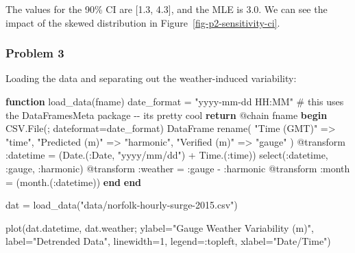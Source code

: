 \documentclass[
  letterpaper,
  DIV=11,
  numbers=noendperiod]{scrartcl}
\newenvironment{Shaded}{\begin{snugshade}}{\end{snugshade}}
\newcommand{\CommentTok}[1]{\textcolor[rgb]{0.37,0.37,0.37}{#1}}
\newcommand{\ControlFlowTok}[1]{\textcolor[rgb]{0.00,0.23,0.31}{\textbf{#1}}}
\newcommand{\DataTypeTok}[1]{\textcolor[rgb]{0.68,0.00,0.00}{#1}}
\newcommand{\FloatTok}[1]{\textcolor[rgb]{0.68,0.00,0.00}{#1}}
\newcommand{\FunctionTok}[1]{\textcolor[rgb]{0.28,0.35,0.67}{#1}}
\newcommand{\KeywordTok}[1]{\textcolor[rgb]{0.00,0.23,0.31}{\textbf{#1}}}
\newcommand{\NormalTok}[1]{\textcolor[rgb]{0.00,0.23,0.31}{#1}}
\newcommand{\OperatorTok}[1]{\textcolor[rgb]{0.37,0.37,0.37}{#1}}
\newcommand{\PreprocessorTok}[1]{\textcolor[rgb]{0.68,0.00,0.00}{#1}}
\newcommand{\StringTok}[1]{\textcolor[rgb]{0.13,0.47,0.30}{#1}}
\begin{document}
The values for the 90\% CI are {[}1.3, 4.3{]}, and the MLE is 3.0. We
can see the impact of the skewed distribution in
Figure~\ref{fig-p2-sensitivity-ci}.

\subsubsection{Problem 3}\label{problem-3}

Loading the data and separating out the weather-induced variability:

\begin{Shaded}
\begin{Highlighting}[]
\KeywordTok{function} \FunctionTok{load\_data}\NormalTok{(fname)}
\NormalTok{    date\_format }\OperatorTok{=} \StringTok{"yyyy{-}mm{-}dd HH:MM"}
    \CommentTok{\# this uses the DataFramesMeta package {-}{-} it\textquotesingle{}s pretty cool}
    \ControlFlowTok{return} \PreprocessorTok{@chain}\NormalTok{ fname }\ControlFlowTok{begin}
\NormalTok{        CSV.}\FunctionTok{File}\NormalTok{(; dateformat}\OperatorTok{=}\NormalTok{date\_format)}
\NormalTok{        DataFrame}
        \FunctionTok{rename}\NormalTok{(}
            \StringTok{"Time (GMT)"} \OperatorTok{=\textgreater{}} \StringTok{"time"}\NormalTok{, }\StringTok{"Predicted (m)"} \OperatorTok{=\textgreater{}} \StringTok{"harmonic"}\NormalTok{, }\StringTok{"Verified (m)"} \OperatorTok{=\textgreater{}} \StringTok{"gauge"}
\NormalTok{        )}
        \PreprocessorTok{@transform} \OperatorTok{:}\NormalTok{datetime }\OperatorTok{=}\NormalTok{ (}\FunctionTok{Date}\NormalTok{.(}\OperatorTok{:}\DataTypeTok{Date}\NormalTok{, }\StringTok{"yyyy/mm/dd"}\NormalTok{) }\OperatorTok{+} \FunctionTok{Time}\NormalTok{.(}\OperatorTok{:}\NormalTok{time))}
        \FunctionTok{select}\NormalTok{(}\OperatorTok{:}\NormalTok{datetime, }\OperatorTok{:}\NormalTok{gauge, }\OperatorTok{:}\NormalTok{harmonic)}
        \PreprocessorTok{@transform} \OperatorTok{:}\NormalTok{weather }\OperatorTok{=} \OperatorTok{:}\NormalTok{gauge }\OperatorTok{{-}} \OperatorTok{:}\NormalTok{harmonic}
        \PreprocessorTok{@transform} \OperatorTok{:}\NormalTok{month }\OperatorTok{=}\NormalTok{ (}\FunctionTok{month}\NormalTok{.(}\OperatorTok{:}\NormalTok{datetime))}
    \ControlFlowTok{end}
\KeywordTok{end}

\NormalTok{dat }\OperatorTok{=} \FunctionTok{load\_data}\NormalTok{(}\StringTok{"data/norfolk{-}hourly{-}surge{-}2015.csv"}\NormalTok{)}

\FunctionTok{plot}\NormalTok{(dat.datetime, dat.weather; ylabel}\OperatorTok{=}\StringTok{"Gauge Weather Variability (m)"}\NormalTok{, label}\OperatorTok{=}\StringTok{"Detrended Data"}\NormalTok{, linewidth}\OperatorTok{=}\FloatTok{1}\NormalTok{, legend}\OperatorTok{=:}\NormalTok{topleft, xlabel}\OperatorTok{=}\StringTok{"Date/Time"}\NormalTok{)}
\end{Highlighting}
\end{Shaded}
\end{document}
